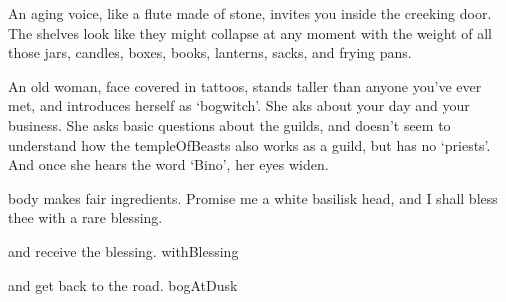 An aging voice, like a flute made of stone, invites you inside the creeking door.
The shelves look like they might collapse at any moment with the weight of all those jars, candles, boxes, books, lanterns, sacks, and frying pans.

An old woman, face covered in tattoos, stands taller than anyone you've ever met, and introduces herself as `\gls{bogwitch}'.
She aks about your day and your business.
She asks basic questions about the guilds, and doesn't seem to understand how the \gls{templeOfBeasts} also works as a guild, but has no `priests'.
And once she hears the word `Bino', her eyes widen.

\begin{speechtext}
   body makes fair \glspl{ingredient}.
  Promise me a white \gls{basilisk} head, and I shall bless thee with a rare blessing.
\end{speechtext}

\begin{selectPath}
  {and receive the blessing.}%
  {withBlessing}

  {and get back to the road.}%
  {bogAtDusk}
\end{selectPath}

